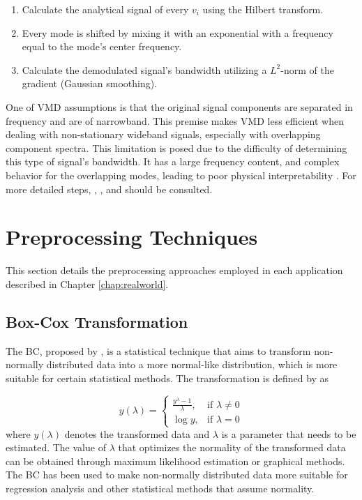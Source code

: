 \begin{enumerate}
    \item Calculate the analytical signal of every $v_i$ using the Hilbert transform.
    \item Every mode is shifted by mixing it with an exponential with a frequency equal to the mode's center frequency.
    \item Calculate the demodulated signal's bandwidth utilizing a $L^2$-norm of the gradient (Gaussian smoothing).
\end{enumerate}

One of \ac{VMD} assumptions is that the original signal components are separated in frequency and are of narrowband. This premise makes \ac{VMD} less efficient when dealing with non-stationary wideband signals, especially with overlapping component spectra. This limitation is posed due to the difficulty of determining this type of signal's bandwidth. It has a large frequency content, and complex behavior for the overlapping modes, leading to poor physical interpretability \cite{moreno2020Multistep}. For more detailed steps, , , and  should be consulted.

\section{Preprocessing Techniques}
This section details the preprocessing approaches employed in each application described in Chapter \ref{chap:realworld}.

\subsection{Box-Cox Transformation}
The \ac{BC}, proposed by , is a statistical technique that aims to transform non-normally distributed data into a more normal-like distribution, which is more suitable for certain statistical methods. The transformation is defined by  as

\begin{equation}
    y(\lambda) =
        \begin{cases}
            \frac{y^{\lambda} - 1}{\lambda}, & \text{if } \lambda \neq 0 \\
            \log y, & \text{if } \lambda = 0
        \end{cases}
\end{equation}
where $y(\lambda)$ denotes the transformed data and $\lambda$ is a parameter that needs to be estimated. The value of $\lambda$ that optimizes the normality of the transformed data can be obtained through maximum likelihood estimation or graphical methods. The \ac{BC} has been used to make non-normally distributed data more suitable for regression analysis and other statistical methods that assume normality.

